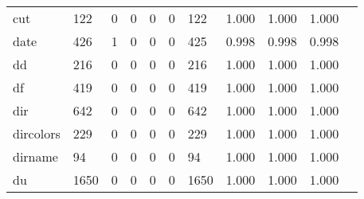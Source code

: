 \begin{longtable}{lp{1.10cm}p{1.10cm}p{1.10cm}p{1.10cm}p{1.10cm}p{1.10cm}p{1.10cm}p{1.10cm}p{1.10cm}p{1.10cm}}
cut       &                    122 &                                  0 &                                 0 &                                0 &                                 0 &                             122 &                          1.000 &                                 1.000 &                               1.000 \\
date      &                    426 &                                  1 &                                 0 &                                0 &                                 0 &                             425 &                          0.998 &                                 0.998 &                               0.998 \\
dd        &                    216 &                                  0 &                                 0 &                                0 &                                 0 &                             216 &                          1.000 &                                 1.000 &                               1.000 \\
df        &                    419 &                                  0 &                                 0 &                                0 &                                 0 &                             419 &                          1.000 &                                 1.000 &                               1.000 \\
dir       &                    642 &                                  0 &                                 0 &                                0 &                                 0 &                             642 &                          1.000 &                                 1.000 &                               1.000 \\
dircolors &                    229 &                                  0 &                                 0 &                                0 &                                 0 &                             229 &                          1.000 &                                 1.000 &                               1.000 \\
dirname   &                     94 &                                  0 &                                 0 &                                0 &                                 0 &                              94 &                          1.000 &                                 1.000 &                               1.000 \\
du        &                   1650 &                                  0 &                                 0 &                                0 &                                 0 &                            1650 &                          1.000 &                                 1.000 &                               1.000 \\

\end{longtable}
